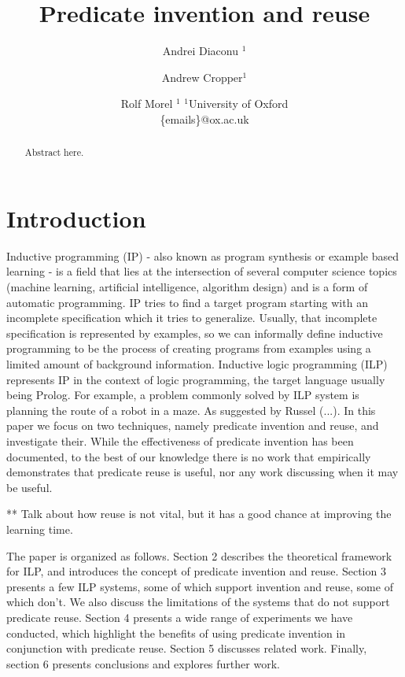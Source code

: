 \documentclass{article}
\title{Predicate invention and reuse}
\author{
Andrei Diaconu $^1$
\and
Andrew Cropper$^1$\and
Rolf Morel $^1$
\affiliations
$^1$University of Oxford\\
\emails
\{emails\}@ox.ac.uk}
\theoremstyle{definition}
\begin{document}
\maketitle




\begin{abstract}
Abstract here.
\end{abstract}




\section{Introduction}
Inductive programming (IP) \cite{indprogmeets} - also known as program synthesis or example based learning - is a field that lies at the intersection of several computer science topics (machine learning, artificial intelligence, algorithm design) and is a form of automatic programming. IP tries to find a target program starting with an incomplete specification which it tries to generalize. Usually, that incomplete specification is represented by examples, so we can informally define inductive programming to be the process of creating programs from examples using a limited amount of background information. Inductive logic programming (ILP) represents IP in the context of logic programming, the target language usually being Prolog. For example, a problem commonly solved by ILP system is planning the route of a robot in a maze. As suggested by Russel (...). In this paper we focus on two techniques, namely predicate invention and reuse, and investigate their. While the effectiveness of predicate invention has been documented, to the best of our knowledge there is no work that empirically demonstrates that predicate reuse is useful, nor any work discussing when it may be useful. 


\par *** Talk about how reuse is not vital, but it has a good chance at improving the learning time.

\par The paper is organized as follows. Section 2 describes the theoretical framework for ILP, and introduces the concept of predicate invention and reuse. Section 3 presents a few ILP systems, some of which support invention and reuse, some of which don't. We also discuss the limitations of the systems that do not support predicate reuse. Section 4 presents a wide range of experiments we have conducted, which highlight the benefits of using predicate invention in conjunction with predicate reuse. Section 5 discusses related work. Finally, section 6 presents conclusions and explores further work.
\end{document}

